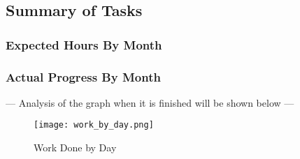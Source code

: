\documentclass[PPFS.tex]{template/subfiles}
\begin{document}

\subsection{Summary of Tasks}


\subsubsection{Expected Hours By Month}


\subsubsection{Actual Progress By Month}

--- Analysis of the graph when it is finished will be shown below ---

\begin{figure}[H]
    \centering
    \texttt{[image: work\_by\_day.png]}
    \caption{Work Done by Day}
\end{figure}
\end{document}
